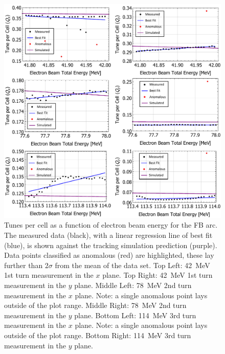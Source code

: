 \documentclass[../main.tex]{subfiles}
\begin{document}
\begin{figure}[!h]
\centering
\includegraphics[width=\textwidth]{Figures/CBETA_Multi-Pass_Commissioning/chromaticity/FB_analysed_3turn_tunes.pdf}
\caption{Tunes per cell as a function of electron beam energy for the FB arc. The measured data (black), with a linear regression line of best fit (blue), is shown against the tracking simulation prediction (purple). Data points classified as anomalous (red) are highlighted, these lay further than $2\sigma$ from the mean of the data set. Top Left: 42~\si{\mega\electronvolt} 1st turn measurement in the $x$ plane. Top Right: 42~\si{\mega\electronvolt} 1st turn measurement in the $y$ plane. Middle Left: 78~\si{\mega\electronvolt} 2nd turn measurement in the $x$ plane. Note: a single anomalous point lays outside of the plot range. Middle Right: 78~\si{\mega\electronvolt} 2nd turn measurement in the $y$ plane. Bottom Left: 114~\si{\mega\electronvolt} 3rd turn measurement in the $x$ plane. Note: a single anomalous point lays outside of the plot range. Bottom Right: 114~\si{\mega\electronvolt} 3rd turn measurement in the $y$ plane.}
\label{fig:FB_analysed_tunes}
\end{figure}
\end{document}

